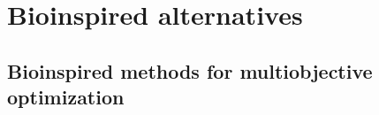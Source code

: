 \chapter{Bioinspired alternatives}
\label{chap:Bio}

\section{Bioinspired methods for multiobjective optimization}
\label{sec:BioMethods}
